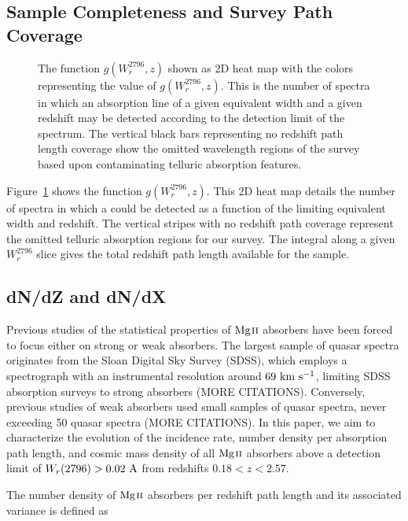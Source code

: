 \documentclass[iop,apj,numberedappendix,appendixfloats,twocolappendix]{emulateapj}
\begin{document}
\subsection{Sample Completeness and Survey Path Coverage}

\begin{figure}[bth]
\caption{The function $g(W_r^{2796}, z)$ shown as 2D heat map with the colors representing the value of $g(W_r^{2796}, z)$. This is the number of spectra in which an absorption line of a given equivalent width and a given redshift may be detected according to the detection limit of the spectrum. The vertical black bars representing no redshift path length coverage show the omitted wavelength regions of the survey based upon contaminating telluric absorption features.}
\label{fig:gwz}
\end{figure}

Figure~\ref{fig:gwz} shows the function $g(W_r^{2796}, z)$. This 2D heat map details the number of spectra in which a {\MgIIdblt} could be detected as a function of the limiting equivalent width and redshift. The vertical stripes with no redshift path coverage represent the omitted telluric absorption regions for our survey. The integral along a given $W_r^{2796}$ slice gives the total redshift path length available for the sample. 

\subsection{dN/dZ and dN/dX}
\label{dndzdndx}

Previous studies of the statistical properties of ${\hbox{{\rm Mg}\kern 0.1em{\sc ii}}}$ absorbers have been forced to focus either on strong or weak absorbers. The largest sample of quasar spectra originates from the Sloan Digital Sky Survey (SDSS), which employs a spectrograph with an instrumental resolution around $69~\hbox{km~s$^{-1}$}$, limiting SDSS absorption surveys to strong absorbers \citep{Zhu2013,Cooksey2013} (MORE CITATIONS). Conversely, previous studies of weak absorbers used small samples of quasar spectra, never exceeding 50 quasar spectra \citep{Kacprzak2011} (MORE CITATIONS). In this paper, we aim to characterize the evolution of the incidence rate, number density per absorption path length, and cosmic mass density of all ${\hbox{{\rm Mg}\kern 0.1em{\sc ii}}}$ absorbers above a detection limit of $W_r(2796) > 0.02~\mathrm{\AA}$ from redshifts $0.18 < z < 2.57$.

The number density of ${\hbox{{\rm Mg}\kern 0.1em{\sc ii}}}$ absorbers per redshift path length and its associated variance is defined as
\end{document}
